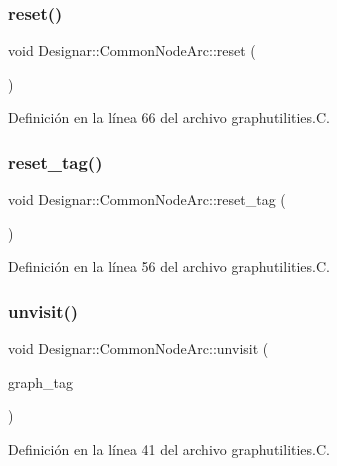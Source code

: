 \subsubsection{\texorpdfstring{reset()}{reset()}}
{\footnotesize\ttfamily void Designar\+::\+Common\+Node\+Arc\+::reset (\begin{DoxyParamCaption}{ }\end{DoxyParamCaption})}



Definición en la línea 66 del archivo graphutilities.\+C.

\mbox{\label{class_designar_1_1_common_node_arc_a436f2993d4da6ec9f750adc465e7c691}} 
\subsubsection{\texorpdfstring{reset\+\_\+tag()}{reset\_tag()}}
{\footnotesize\ttfamily void Designar\+::\+Common\+Node\+Arc\+::reset\+\_\+tag (\begin{DoxyParamCaption}{ }\end{DoxyParamCaption})}



Definición en la línea 56 del archivo graphutilities.\+C.

\mbox{\label{class_designar_1_1_common_node_arc_ae8f3fed57cacf9e8cfa0df582eeecf3b}} 
\subsubsection{\texorpdfstring{unvisit()}{unvisit()}}
{\footnotesize\ttfamily void Designar\+::\+Common\+Node\+Arc\+::unvisit (\begin{DoxyParamCaption}\item[{\hyperlink{namespace_designar_ac91366256ea6ea6ac5fd483d55a7499e}{Graph\+Tag}}]{graph\+\_\+tag }\end{DoxyParamCaption})}



Definición en la línea 41 del archivo graphutilities.\+C.

